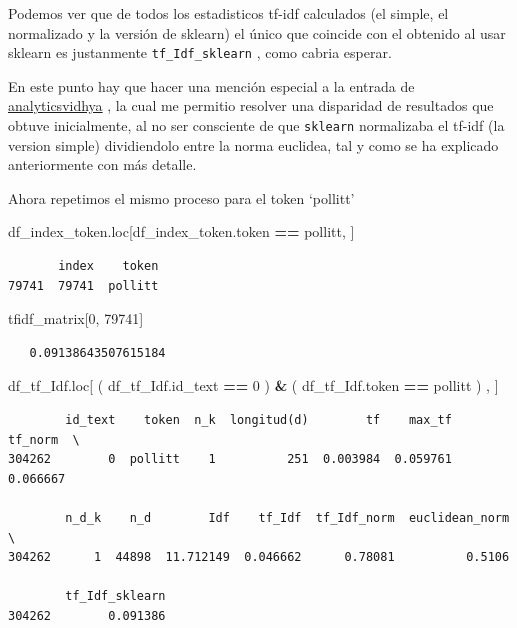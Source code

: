 \documentclass[
  11pt,
  a4paper,
]{article}
\newenvironment{Shaded}{\begin{snugshade}}{\end{snugshade}}
\newcommand{\DecValTok}[1]{\textcolor[rgb]{0.00,0.00,0.81}{#1}}
\newcommand{\NormalTok}[1]{#1}
\newcommand{\OperatorTok}[1]{\textcolor[rgb]{0.81,0.36,0.00}{\textbf{#1}}}
\newcommand{\StringTok}[1]{\textcolor[rgb]{0.31,0.60,0.02}{#1}}
\begin{document}
Podemos ver que de todos los estadisticos tf-idf calculados (el simple,
el normalizado y la versión de sklearn) el único que coincide con el
obtenido al usar sklearn es justanmente \texttt{tf\_Idf\_sklearn} , como
cabria esperar.

En este punto hay que hacer una mención especial a la entrada de
\href{https://www.analyticsvidhya.com/blog/2021/11/how-sklearns-tfidfvectorizer-calculates-tf-idf-values/}{analyticsvidhya}
, la cual me permitio resolver una disparidad de resultados que obtuve
inicialmente, al no ser consciente de que \texttt{sklearn} normalizaba
el tf-idf (la version simple) dividiendolo entre la norma euclidea, tal
y como se ha explicado anteriormente con más detalle.

Ahora repetimos el mismo proceso para el token `pollitt'

\begin{Shaded}
\begin{Highlighting}[]
\NormalTok{df\_index\_token.loc[df\_index\_token.token }\OperatorTok{==} \StringTok{\textquotesingle{}pollitt\textquotesingle{}}\NormalTok{, ]}
\end{Highlighting}
\end{Shaded}

\begin{verbatim}
       index    token
79741  79741  pollitt
\end{verbatim}

\begin{Shaded}
\begin{Highlighting}[]
\NormalTok{tfidf\_matrix[}\DecValTok{0}\NormalTok{, }\DecValTok{79741}\NormalTok{]}
\end{Highlighting}
\end{Shaded}

\begin{verbatim}
   0.09138643507615184
\end{verbatim}

\begin{Shaded}
\begin{Highlighting}[]
\NormalTok{df\_tf\_Idf.loc[ ( df\_tf\_Idf.id\_text }\OperatorTok{==} \DecValTok{0}\NormalTok{ ) }\OperatorTok{\&}\NormalTok{  ( df\_tf\_Idf.token }\OperatorTok{==} \StringTok{\textquotesingle{}pollitt\textquotesingle{}}\NormalTok{ ) , ]}
\end{Highlighting}
\end{Shaded}

\begin{verbatim}
        id_text    token  n_k  longitud(d)        tf    max_tf   tf_norm  \
304262        0  pollitt    1          251  0.003984  0.059761  0.066667   

        n_d_k    n_d        Idf    tf_Idf  tf_Idf_norm  euclidean_norm  \
304262      1  44898  11.712149  0.046662      0.78081          0.5106   

        tf_Idf_sklearn  
304262        0.091386  
\end{verbatim}
\end{document}
